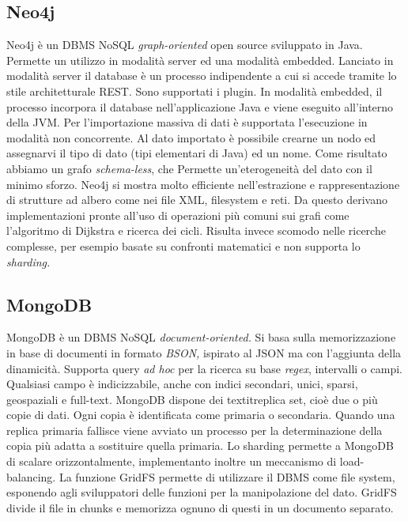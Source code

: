    \subsection{Neo4j}
    Neo4j è un DBMS NoSQL \textit{graph-oriented} open source sviluppato in Java.
    Permette un utilizzo in modalità server ed una modalità embedded.
    Lanciato in modalità server il database è un processo indipendente a cui
    si accede tramite lo stile architetturale REST. Sono supportati i plugin. 
    In modalità embedded, il processo incorpora il database nell'applicazione 
    Java e viene eseguito all'interno della JVM. Per l'importazione massiva di dati 
    è supportata l'esecuzione in modalità non concorrente. Al dato importato 
    è possibile crearne un nodo ed assegnarvi il tipo di dato (tipi elementari 
    di Java) ed un nome. Come risultato abbiamo un grafo \textit{schema-less}, che Permette 
    un'eterogeneità del dato con il minimo sforzo. Neo4j si mostra
    molto efficiente nell'estrazione e rappresentazione di strutture
    ad albero come nei file XML, filesystem e reti. Da questo derivano
    implementazioni pronte all'uso di operazioni più comuni sui grafi
    come l'algoritmo di Dijkstra e ricerca dei cicli. Risulta invece scomodo
    nelle ricerche complesse, per esempio basate su confronti matematici e non
    supporta lo \textit{sharding.}

    \subsection{MongoDB}
    MongoDB è un DBMS NoSQL \textit{document-oriented.} Si basa sulla memorizzazione
    in base di documenti in formato \textit{BSON,} ispirato al JSON ma con l'aggiunta
    della dinamicità. Supporta query \textit{ad hoc} per la ricerca su base
    \textit{regex}, intervalli o campi. Qualsiasi campo è indicizzabile, anche
    con indici secondari, unici, sparsi, geospaziali e full-text. MongoDB dispone
    dei textit{replica set,} cioè due o più copie di dati. Ogni copia è identificata come
    primaria o secondaria. Quando una replica primaria fallisce viene avviato un processo
    per la determinazione della copia più adatta a sostituire quella primaria. Lo sharding
    permette a MongoDB di scalare orizzontalmente, implementanto inoltre un
    meccanismo di load-balancing. La funzione GridFS permette di utilizzare il DBMS come file system,
    esponendo agli sviluppatori delle funzioni per la manipolazione del dato. GridFS divide il file
    in chunks e memorizza ognuno di questi in un documento separato.  

